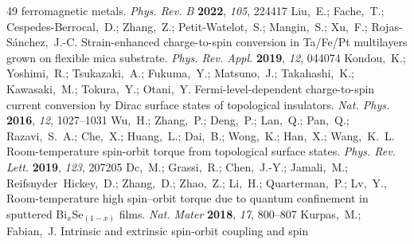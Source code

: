 \documentclass[journal=jacsat,manuscript=article]{achemso}
\begin{document}
\begin{mcitethebibliography}{49}
  ferromagnetic metals. \emph{Phys. Rev. B} \textbf{2022}, \emph{105},
  224417\relax
\mciteBstWouldAddEndPuncttrue
\mciteSetBstMidEndSepPunct{\mcitedefaultmidpunct}
{\mcitedefaultendpunct}{\mcitedefaultseppunct}\relax
\EndOfBibitem
{}
Liu,~E.; Fache,~T.; Cespedes-Berrocal,~D.; Zhang,~Z.; Petit-Watelot,~S.;
  Mangin,~S.; Xu,~F.; Rojas-S{\'a}nchez,~J.-C. Strain-enhanced charge-to-spin
  conversion in Ta/Fe/Pt multilayers grown on flexible mica substrate.
  \emph{Phys. Rev. Appl.} \textbf{2019}, \emph{12}, 044074\relax
\mciteBstWouldAddEndPuncttrue
\mciteSetBstMidEndSepPunct{\mcitedefaultmidpunct}
{\mcitedefaultendpunct}{\mcitedefaultseppunct}\relax
\EndOfBibitem
{}
Kondou,~K.; Yoshimi,~R.; Tsukazaki,~A.; Fukuma,~Y.; Matsuno,~J.; Takahashi,~K.;
  Kawasaki,~M.; Tokura,~Y.; Otani,~Y. Fermi-level-dependent charge-to-spin
  current conversion by Dirac surface states of topological insulators.
  \emph{Nat. Phys.} \textbf{2016}, \emph{12}, 1027--1031\relax
\mciteBstWouldAddEndPuncttrue
\mciteSetBstMidEndSepPunct{\mcitedefaultmidpunct}
{\mcitedefaultendpunct}{\mcitedefaultseppunct}\relax
\EndOfBibitem
{}
Wu,~H.; Zhang,~P.; Deng,~P.; Lan,~Q.; Pan,~Q.; Razavi,~S.~A.; Che,~X.;
  Huang,~L.; Dai,~B.; Wong,~K.; Han,~X.; Wang,~K.~L. Room-temperature
  spin-orbit torque from topological surface states. \emph{Phys. Rev. Lett.}
  \textbf{2019}, \emph{123}, 207205\relax
\mciteBstWouldAddEndPuncttrue
\mciteSetBstMidEndSepPunct{\mcitedefaultmidpunct}
{\mcitedefaultendpunct}{\mcitedefaultseppunct}\relax
\EndOfBibitem
{}
Dc,~M.; Grassi,~R.; Chen,~J.-Y.; Jamali,~M.; Reifsnyder~Hickey,~D.; Zhang,~D.;
  Zhao,~Z.; Li,~H.; Quarterman,~P.; Lv,~Y.,   Room-temperature
  high spin--orbit torque due to quantum confinement in sputtered
  Bi$_x$Se$_{(1-x)}$ films. \emph{Nat. Mater} \textbf{2018}, \emph{17},
  800--807\relax
\mciteBstWouldAddEndPuncttrue
\mciteSetBstMidEndSepPunct{\mcitedefaultmidpunct}
{\mcitedefaultendpunct}{\mcitedefaultseppunct}\relax
\EndOfBibitem
{}
Kurpas,~M.; Fabian,~J. Intrinsic and extrinsic spin-orbit coupling and spin

\end{mcitethebibliography}
\end{document}
